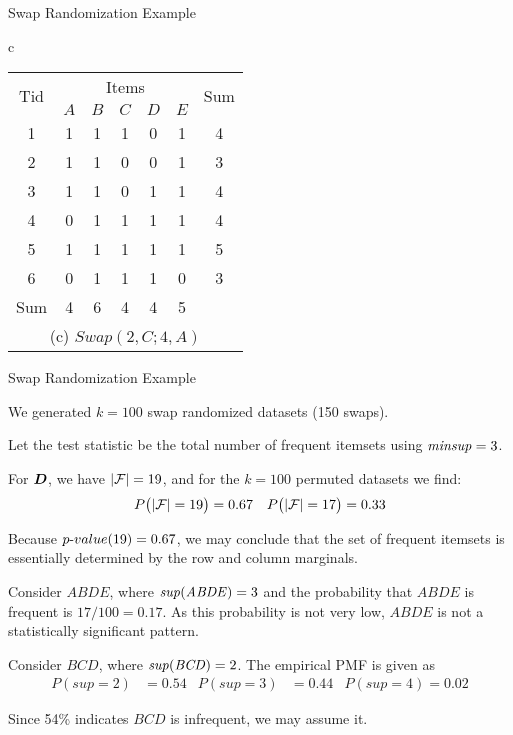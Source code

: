 \begin{frame}[fragile]{Swap Randomization Example}
\begin{table}[H]
{{\begin{tabular}{c}
{{\centering
\begin{tabular}{|c||c|c|c|c|c||c|}
\hline
\multirow{2}{*}{Tid} & \multicolumn{5}{c||}{Items} &
\multirow{2}{*}{Sum}\\ \cline{2-6}
& $A$ & $B$ & $C$ & $D$ & $E$ & \\ \hline\hline
1 & 1&1& 1& 0 & 1& 4 \\ \hline
2 & \cellcolor{gray!50}1&1&\cellcolor{gray!50}0 &0 &1& 3\\ \hline
3 & 1&1& 0&1&1& 4\\ \hline
4 & \cellcolor{gray!50}0 &1& \cellcolor{gray!50}1& 1&1& 4\\ \hline
5 & 1&1&1&1&1& 5\\ \hline
6 & 0 &1&1&1&0 & 3\\ \hline \hline
Sum&4&6&4&4&5& \\ \hline
\multicolumn{7}{c}{\fontsize{8}{8}\selectfont(c) $Swap(2,C; 4,A)$}\\
\end{tabular}
}
}
\end{tabular}}{}
}
\end{table}
\end{frame}


\begin{frame}[fragile]{Swap Randomization Example}

We generated $k=100$ swap randomized datasets (150 swaps).

\medskip

Let the test statistic be the total number of
frequent itemsets using $\mathit{minsup}=3$. 

For ${\boldsymbol D}$, we have $|{\mathcal F}| = 19$, and for the
$k=100$ permuted datasets we find:
\begin{align*}
  P\bigl(|{\mathcal F}|=19\bigr) & = 0.67 & P\bigl(|{\mathcal F}| = 17\bigr) = 0.33
\end{align*}


Because ${p\text{-}value}(19)=0.67$, we may conclude
that the set of frequent itemsets is essentially
determined by the row and column marginals.

\medskip

	Consider $\mathit{ABDE}$, where
$\mathit{sup}(\mathit{ABDE})=3$ and the probability
that $\mathit{ABDE}$ is frequent is $17/100 = 0.17$. 
As this probability is not very low,
$\mathit{ABDE}$ is not a statistically signif\/{i}cant pattern.

\medskip

Consider $\mathit{BCD}$, where
$\mathit{sup}(\mathit{BCD})=2$. The empirical PMF is given as
\begin{align*}
  P(sup=2) & = 0.54 & P(sup = 3) & = 0.44 & P(sup=4) = 0.02
\end{align*}

	Since 54\% indicates $\mathit{BCD}$ is infrequent, we may assume it.

\end{frame}



